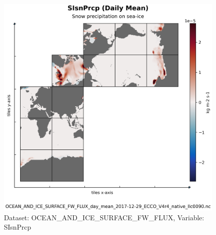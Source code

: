\begin{figure}[H]
\centering
\includegraphics[scale=0.55]{../images/plots/native_plots/Ocean_and_Sea-Ice_Surface_Freshwater_Fluxes/SIsnPrcp.png}
\caption{Dataset: OCEAN\_AND\_ICE\_SURFACE\_FW\_FLUX, Variable: SIsnPrcp}
\label{tab:table-OCEAN_AND_ICE_SURFACE_FW_FLUX_SIsnPrcp-Plot}
\end{figure}
\pagebreak
